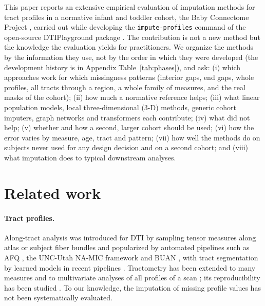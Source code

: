 \documentclass[11pt]{article}
\begin{document}
This paper reports an extensive empirical evaluation of imputation methods for tract profiles in a normative infant
and toddler cohort, the Baby Connectome Project \citep[BCP;][]{howell2019bcp}, carried out while developing the
\texttt{impute-profiles} command of the open-source DTIPlayground package \citep{dtiplayground}. The contribution is
not a new method but the knowledge the evaluation yields for practitioners. We organize the methods by the
information they use, not by the order in which they were developed (the development history is in Appendix
Table~\ref{tab:phases}), and ask:
(i) which approaches work for which missingness patterns (interior gaps, end gaps, whole profiles, all tracts through
a region, a whole family of measures, and the real masks of the cohort);
(ii) how much a normative reference helps;
(iii) what linear population models, local three-dimensional (3-D) methods, generic cohort imputers, graph networks and
transformers each contribute;
(iv) what did not help;
(v) whether and how a second, larger cohort \citep[HBCD;][]{volkow2021hbcd,dean2024hbcdmri} should be used;
(vi) how the error varies by measure, age, tract and pattern;
(vii) how well the methods do on subjects never used for any design decision and on a second cohort; and
(viii) what imputation does to typical downstream analyses.

\section{Related work}

\paragraph{Tract profiles.} Along-tract analysis was introduced for DTI by sampling tensor measures along atlas or
subject fiber bundles \citep{goodlett2009group,colby2012alongtract} and popularized by automated pipelines such as
AFQ \citep{yeatman2012afq}, the UNC-Utah NA-MIC framework \citep{verde2014unc} and BUAN \citep{chandio2020buan}, with
tract segmentation by learned models in recent pipelines \citep{wasserthal2018tractseg}. Tractometry has been extended
to many measures \citep{chamberland2019dimensionality} and to multivariate analyses of all profiles of a scan
\citep{richiehalford2021afqinsight}; its reproducibility has been studied
\citep{cousineau2017ppmi,kruper2021reliability}. To our knowledge, the imputation of missing profile values has not been
systematically evaluated.
\end{document}
